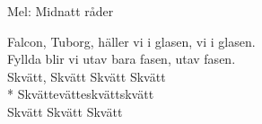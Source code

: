 \begin{SongText}[Diurvisan]
    \begin{SongInfo}
        Mel: Midnatt råder
    \end{SongInfo}
    \begin{SongVerse}
        Falcon, Tuborg, häller vi i glasen, vi i glasen.\\%
        Fyllda blir vi utav bara fasen, utav fasen.\\%
        Skvätt, Skvätt Skvätt Skvätt\\* Skvättevätteskvättskvätt\\%
        Skvätt Skvätt Skvätt
    \end{SongVerse}
\end{SongText}
